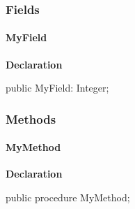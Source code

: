 \documentclass{report}
\begin{document}
\subsubsection*{\large{\textbf{Fields}}\normalsize\hspace{1ex}\hfill}
\paragraph*{MyField}\hspace*{\fill}

\begin{list}{}{
\setlength{\itemindent}{0cm}
\setlength{\listparindent}{0cm}
\setlength{\leftmargin}{\evensidemargin}
\addtolength{\leftmargin}{\tmplength}
\settowidth{\labelsep}{X}
\addtolength{\leftmargin}{\labelsep}
\setlength{\labelwidth}{\tmplength}
}
\begin{flushleft}
\item[\textbf{Declaration}\hfill]
\begin{ttfamily}
public MyField: Integer;\end{ttfamily}


\end{flushleft}
\end{list}
\subsubsection*{\large{\textbf{Methods}}\normalsize\hspace{1ex}\hfill}
\paragraph*{MyMethod}\hspace*{\fill}

\begin{list}{}{
\setlength{\itemindent}{0cm}
\setlength{\listparindent}{0cm}
\setlength{\leftmargin}{\evensidemargin}
\addtolength{\leftmargin}{\tmplength}
\settowidth{\labelsep}{X}
\addtolength{\leftmargin}{\labelsep}
\setlength{\labelwidth}{\tmplength}
}
\begin{flushleft}
\item[\textbf{Declaration}\hfill]
\begin{ttfamily}
public procedure MyMethod;\end{ttfamily}


\end{flushleft}
\end{list}
\end{document}
